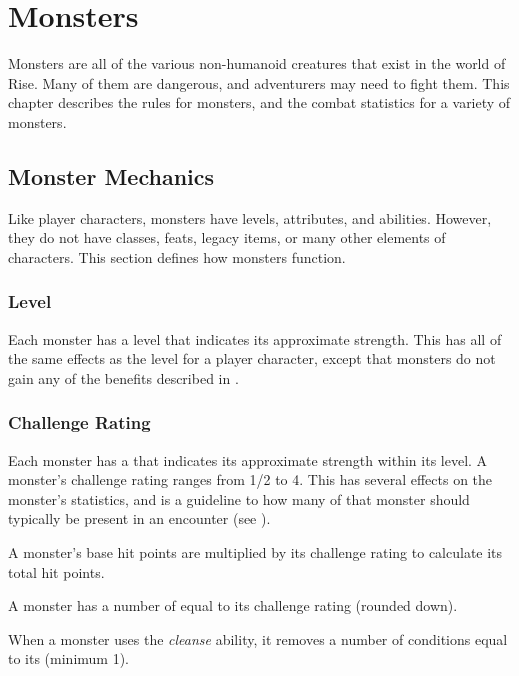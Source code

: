 \chapter{Monsters}

Monsters are all of the various non-humanoid creatures that exist in the world of Rise.
Many of them are dangerous, and adventurers may need to fight them.
This chapter describes the rules for monsters, and the combat statistics for a variety of monsters.

\section{Monster Mechanics}
    Like player characters, monsters have levels, attributes, and abilities.
    However, they do not have classes, feats, legacy items, or many other elements of characters.
    This section defines how monsters function.

    \subsection{Level}
        Each monster has a level that indicates its approximate strength.
        This has all of the same effects as the level for a player character, except that monsters do not gain any of the benefits described in .

    \subsection{Challenge Rating}\label{Challenge Rating}
        Each monster has a  that indicates its approximate strength within its level.
        A monster's challenge rating ranges from 1/2 to 4.
        This has several effects on the monster's statistics, and is a guideline to how many of that monster should typically be present in an encounter (see ).

         A monster's base hit points are multiplied by its challenge rating to calculate its total hit points.

         A monster has a number of  equal to its challenge rating  (rounded down).

         When a monster uses the \textit{cleanse} ability, it removes a number of conditions equal to its  (minimum 1).

